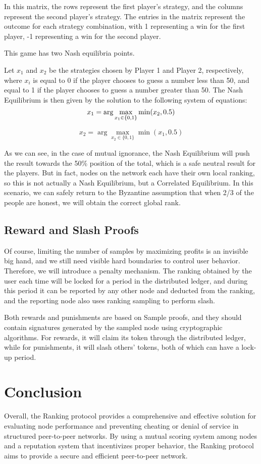 \documentclass[twocolumn]{article}
\begin{document}
In this matrix, the rows represent the first player's strategy, and the columns represent the second player's strategy. The entries in the matrix represent the outcome for each strategy combination, with 1 representing a win for the first player, -1 representing a win for the second player.

This game has two Nash equilibria points.

Let $x_1$ and $x_2$ be the strategies chosen by Player 1 and Player 2, respectively, where $x_i$ is equal to 0 if the player chooses to guess a number less than 50, and equal to 1 if the player chooses to guess a number greater than 50. The Nash Equilibrium is then given by the solution to the following system of equations:
\begin{equation}
  x_1 = \arg\max_{x_1 \in \{0,1\}} \min(x_2, 0.5)\\
\end{equation}

\begin{equation}
x_2 = \arg\max_{x_2 \in \{0,1\}} \min(x_1, 0.5)
\end{equation}

As we can see, in the case of mutual ignorance, the Nash Equilibrium will push the result towards the 50\% position of the total, which is a safe neutral result for the players. But in fact, nodes on the network each have their own local ranking, so this is not actually a Nash Equilibrium, but a Correlated Equilibrium. In this scenario, we can safely return to the Byzantine assumption that when 2/3 of the people are honest, we will obtain the correct global rank.

\subsection{Reward and Slash Proofs}
Of course, limiting the number of samples by maximizing profits is an invisible big hand, and we still need visible hard boundaries to control user behavior. Therefore, we will introduce a penalty mechanism. The ranking obtained by the user each time will be locked for a period in the distributed ledger, and during this period it can be reported by any other node and deducted from the ranking, and the reporting node also uses ranking sampling to perform slash.

Both rewards and punishments are based on Sample proofs, and they should contain signatures generated by the sampled node using cryptographic algorithms. For rewards, it will claim its token through the distributed ledger, while for punishments, it will slash others' tokens, both of which can have a lock-up period.
\section{Conclusion}
Overall, the Ranking protocol provides a comprehensive and effective solution for evaluating node performance and preventing cheating or denial of service in structured peer-to-peer networks. By using a mutual scoring system among nodes and a reputation system that incentivizes proper behavior, the Ranking protocol aims to provide a secure and efficient peer-to-peer network.


\end{document}
